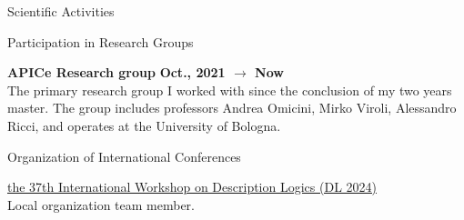 \documentclass{resume} %
\begin{document}
    \begin{rSection}{Scientific Activities}


        \begin{rSubsection2}{Participation in Research Groups}
            \item\textbf{ APICe Research group }\hfill \textbf{Oct., 2021 $\rightarrow$ Now}
            \\The primary research group I worked with since the conclusion of my two years master.
            The group includes professors Andrea Omicini, Mirko Viroli, Alessandro Ricci, and operates at the University of Bologna.
        \end{rSubsection2}


        \begin{rSubsection2}{Organization of International Conferences}
            \item \href{https://dl2024.w.uib.no/organization/}{the 37th International Workshop on Description Logics (DL 2024)}
            \\Local organization team member.
        \end{rSubsection2}



\end{rSection}
\end{document}
